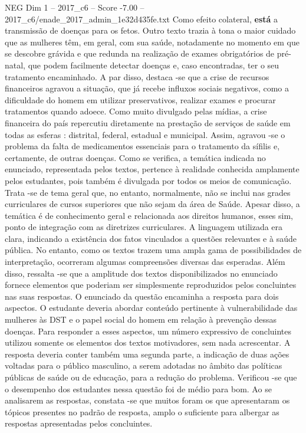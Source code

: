 \begin{textsample}{NEG Dim 1 – 2017\_c6 – Score -7.00 – 2017\_c6/enade\_2017\_admin\_1e32d435fe.txt}
Como efeito colateral, \textbf{está} a transmissão de doenças para os fetos.
Outro texto trazia à tona o maior cuidado que as mulheres têm, em geral, com sua saúde, notadamente no momento em que se descobre grávida e que redunda na realização de exames obrigatórios de pré-natal, que podem facilmente detectar doenças e, caso encontradas, ter o seu tratamento encaminhado.
A par disso, destaca -se que a crise de recursos financeiros agravou a situação, que já recebe influxos sociais negativos, como a dificuldade do homem em utilizar preservativos, realizar exames e procurar tratamentos quando adoece.
Como muito divulgado pelas mídias, a crise financeira do país repercutiu diretamente na prestação de serviços de saúde em todas as esferas : distrital, federal, estadual e municipal.
Assim, agravou -se o problema da falta de medicamentos essenciais para o tratamento da sífilis e, certamente, de outras doenças.
Como se verifica, a temática indicada no enunciado, representada pelos textos, pertence à realidade conhecida amplamente pelos estudantes, pois também é divulgada por todos os meios de comunicação.
Trata -se de tema geral que, no entanto, normalmente, não se inclui nas grades curriculares de cursos superiores que não sejam da área de Saúde.
Apesar disso, a temática é de conhecimento geral e relacionada aos direitos humanos, esses sim, ponto de integração com as diretrizes curriculares.
A linguagem utilizada era clara, indicando a existência dos fatos vinculados a questões relevantes e à saúde pública.
No entanto, como os textos trazem uma ampla gama de possibilidades de interpretação, ocorreram algumas compreensões diversas das esperadas.
Além disso, ressalta -se que a amplitude dos textos disponibilizados no enunciado fornece elementos que poderiam ser simplesmente reproduzidos pelos concluintes nas suas respostas.
O enunciado da questão encaminha a resposta para dois aspectos.
O estudante deveria abordar conteúdo pertinente à vulnerabilidade das mulheres às DST e o papel social do homem em relação à prevenção dessas doenças.
Para responder a esses aspectos, um número expressivo de concluintes utilizou somente os elementos dos textos motivadores, sem nada acrescentar.
A resposta deveria conter também uma segunda parte, a indicação de duas ações voltadas para o público masculino, a serem adotadas no âmbito das políticas públicas de saúde ou de educação, para a redução do problema.
Verificou -se que o desempenho dos estudantes nessa questão foi de médio para bom.
Ao se analisarem as respostas, constata -se que muitos foram os que apresentaram os tópicos presentes no padrão de resposta, amplo o suficiente para albergar as respostas apresentadas pelos concluintes.

\end{textsample}
